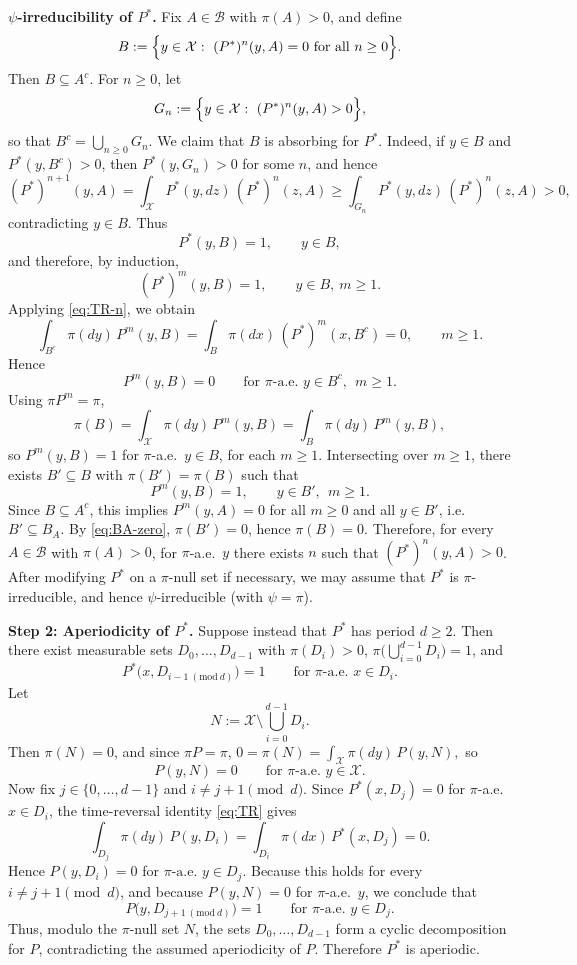 \documentclass[mnsc,nonblindrev]{informs3}
\begin{document}
\noindent\textbf{$\psi$-irreducibility of $P^\ast$.} 
Fix \(A\in\mathcal B\) with
\(\pi(A)>0\), and define
\[
B:=\Bigl\{y\in\mathcal X:\ (P^\ast)^n(y,A)=0\ \text{for all }n\ge0\Bigr\}.
\]
Then \(B\subseteq A^c\). For \(n\ge0\), let
\[
G_n:=\Bigl\{y\in\mathcal X:\ (P^\ast)^n(y,A)>0\Bigr\},
\]
so that \(B^c=\bigcup_{n\ge0}G_n\). We claim that \(B\) is absorbing for \(P^\ast\).
Indeed, if \(y\in B\) and \(P^\ast(y,B^c)>0\), then \(P^\ast(y,G_n)>0\) for some
\(n\), and hence
\[
(P^\ast)^{n+1}(y,A)
=\int_{\mathcal X}P^\ast(y,dz)\,(P^\ast)^n(z,A)
\ge \int_{G_n}P^\ast(y,dz)\,(P^\ast)^n(z,A)>0,
\]
contradicting \(y\in B\). Thus
\[
P^\ast(y,B)=1,\qquad y\in B,
\]
and therefore, by induction,
\[
(P^\ast)^m(y,B)=1,\qquad y\in B,\ m\ge1.
\]
Applying \eqref{eq:TR-n}, we obtain
\[
\int_{B^c}\pi(dy)\,P^m(y,B)
=
\int_B \pi(dx)\,(P^\ast)^m(x,B^c)
=0,
\qquad m\ge1.
\]
Hence
\[
P^m(y,B)=0\qquad\text{for \(\pi\)-a.e.\ }y\in B^c,\ \ m\ge1.
\]
Using \(\pi P^m=\pi\),
\[
\pi(B)
=\int_{\mathcal X}\pi(dy)\,P^m(y,B)
=\int_B \pi(dy)\,P^m(y,B),
\]
so \(P^m(y,B)=1\) for \(\pi\)-a.e.\ \(y\in B\), for each \(m\ge1\). Intersecting
over \(m\ge1\), there exists \(B'\subseteq B\) with \(\pi(B')=\pi(B)\) such that
\[
P^m(y,B)=1,\qquad y\in B',\ \ m\ge1.
\]
Since \(B\subseteq A^c\), this implies \(P^m(y,A)=0\) for all \(m\ge0\) and all
\(y\in B'\), i.e.\ \(B'\subseteq B_A\). By \eqref{eq:BA-zero},
\(\pi(B')=0\), hence \(\pi(B)=0\). Therefore, for every \(A\in\mathcal B\) with
\(\pi(A)>0\), for \(\pi\)-a.e.\ \(y\) there exists \(n\) such that
\((P^\ast)^n(y,A)>0\). After modifying \(P^\ast\) on a \(\pi\)-null set if
necessary, we may assume that \(P^\ast\) is \(\pi\)-irreducible, and hence
\(\psi\)-irreducible (with \(\psi=\pi\)).

\medskip
\noindent\textbf{Step 2: Aperiodicity of $P^\ast$.} 
Suppose instead that \(P^\ast\)
has period \(d\ge2\). Then there exist measurable sets
\(D_0,\dots,D_{d-1}\) with \(\pi(D_i)>0\),
\(\pi\bigl(\bigcup_{i=0}^{d-1}D_i\bigr)=1\), and
\[
P^\ast\bigl(x,D_{i-1\ (\mathrm{mod}\ d)}\bigr)=1
\qquad\text{for \(\pi\)-a.e.\ }x\in D_i.
\]
Let
\[
N:=\mathcal X\setminus\bigcup_{i=0}^{d-1}D_i.
\]
Then \(\pi(N)=0\), and since \(\pi P=\pi\), $0=\pi(N)=\int_{\mathcal X}\pi(dy)\,P(y,N),$ so
\[
P(y,N)=0\qquad\text{for \(\pi\)-a.e.\ }y\in\mathcal X.
\]
Now fix \(j\in\{0,\dots,d-1\}\) and \(i\neq j+1 \pmod d\). Since
\(P^\ast(x,D_j)=0\) for \(\pi\)-a.e.\ \(x\in D_i\), the time-reversal identity
\eqref{eq:TR} gives
\[
\int_{D_j}\pi(dy)\,P(y,D_i)
=
\int_{D_i}\pi(dx)\,P^\ast(x,D_j)
=0.
\]
Hence $P(y,D_i)=0$ for $\text{\(\pi\)-a.e.\ }y\in D_j.$ Because this holds for every \(i\neq j+1 \pmod d\), and because \(P(y,N)=0\) for
\(\pi\)-a.e.\ \(y\), we conclude that
\[
P\bigl(y,D_{j+1\ (\mathrm{mod}\ d)}\bigr)=1
\qquad\text{for \(\pi\)-a.e.\ }y\in D_j.
\]
Thus, modulo the \(\pi\)-null set \(N\), the sets \(D_0,\dots,D_{d-1}\) form a
cyclic decomposition for \(P\), contradicting the assumed aperiodicity of \(P\).
Therefore \(P^\ast\) is aperiodic.
\end{document}
